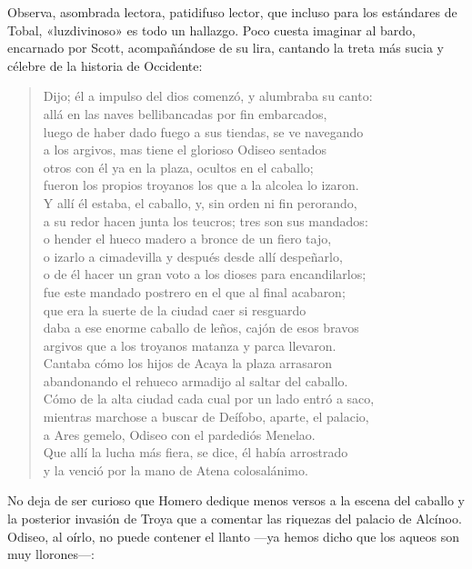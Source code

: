 \documentclass[11pt,a4paper]{article}
\begin{document}
Observa, asombrada lectora, patidifuso lector, que incluso para los estándares de Tobal, «luzdivinoso» es todo un hallazgo. Poco cuesta imaginar al bardo, encarnado por Scott, acompañándose de su lira, cantando la treta más sucia y célebre de la historia de Occidente:

\begin{verse}
Dijo; él a impulso del dios comenzó, y alumbraba su canto:\\
allá en las naves bellibancadas por fin embarcados,\\
luego de haber dado fuego a sus tiendas, se ve navegando\\
a los argivos, mas tiene el glorioso Odiseo sentados\\
otros con él ya en la plaza, ocultos en el caballo;\\
fueron los propios troyanos los que a la alcolea lo izaron.\\
Y allí él estaba, el caballo, y, sin orden ni fin perorando,\\
a su redor hacen junta los teucros; tres son sus mandados:\\
o hender el hueco madero a bronce de un fiero tajo,\\
o izarlo a cimadevilla y después desde allí despeñarlo,\\
o de él hacer un gran voto a los dioses para encandilarlos;\\
fue este mandado postrero en el que al final acabaron;\\
que era la suerte de la ciudad caer si resguardo\\
daba a ese enorme caballo de leños, cajón de esos bravos\\
argivos que a los troyanos matanza y parca llevaron.\\
Cantaba cómo los hijos de Acaya la plaza arrasaron\\
abandonando el rehueco armadijo al saltar del caballo.\\
Cómo de la alta ciudad cada cual por un lado entró a saco,\\
mientras marchose a buscar de Deífobo, aparte, el palacio,\\
a Ares gemelo, Odiseo con el pardediós Menelao.\\
Que allí la lucha más fiera, se dice, él había arrostrado\\
y la venció por la mano de Atena colosalánimo.
\end{verse}

No deja de ser curioso que Homero dedique menos versos a la escena del caballo y la posterior invasión de Troya que a comentar las riquezas del palacio de Alcínoo. Odiseo, al oírlo, no puede contener el llanto ---ya hemos dicho que los aqueos son muy llorones---:
\end{document}
